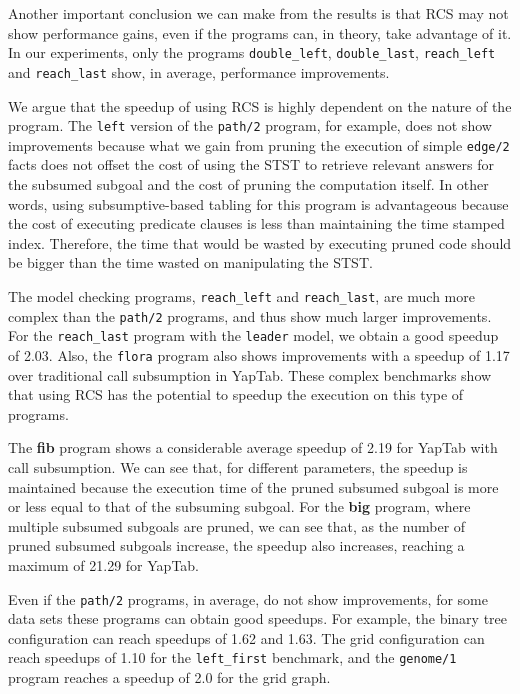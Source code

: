 Another important conclusion we can make from the results is that RCS may not show performance gains, even if the
programs can, in theory, take advantage of it. In our experiments, only the programs \texttt{double\_left},
\texttt{double\_last}, \texttt{reach\_left} and \texttt{reach\_last} show, in average, performance improvements.

We argue that the speedup of using RCS is highly dependent on the nature of the program.
The \texttt{left} version
of the \texttt{path/2} program, for example, does not show improvements because what we gain from pruning the
execution of simple \texttt{edge/2} facts does not offset the cost of using the STST to retrieve relevant answers
for the subsumed subgoal and
the cost of pruning the computation itself. In other words, using subsumptive-based tabling for this program is
advantageous because the cost of executing predicate clauses is less than maintaining the time stamped index.
Therefore, the time that would be wasted by executing pruned code should be bigger than the time wasted
on manipulating the STST.

The model checking programs, \texttt{reach\_left} and \texttt{reach\_last}, are much more complex than the \texttt{path/2}
programs, and thus show much larger improvements. For the \texttt{reach\_last} program with the \texttt{leader} model,
we obtain a good speedup of 2.03. Also, the \texttt{flora} program also shows improvements with a speedup of 1.17 over
traditional call subsumption in YapTab. These complex benchmarks show that using RCS has the potential to speedup the
execution on this type of programs.

The \textbf{fib} program shows a considerable average speedup of 2.19 for YapTab with call subsumption.
We can see that, for different parameters, the speedup is maintained because the execution time of the pruned subsumed
subgoal is more or less equal to that of the subsuming subgoal. For the \textbf{big} program, where multiple
subsumed subgoals are pruned, we can see that, as the number of pruned subsumed subgoals increase, the speedup
also increases, reaching a maximum of 21.29 for YapTab.

Even if the \texttt{path/2} programs, in average, do not show improvements, for some data sets
these programs can obtain good speedups. For example, the binary tree configuration can reach speedups of 1.62 and 1.63. The grid configuration can reach speedups of 1.10 for the \texttt{left\_first} benchmark, and the \texttt{genome/1}
program reaches a speedup of 2.0 for the grid graph.

